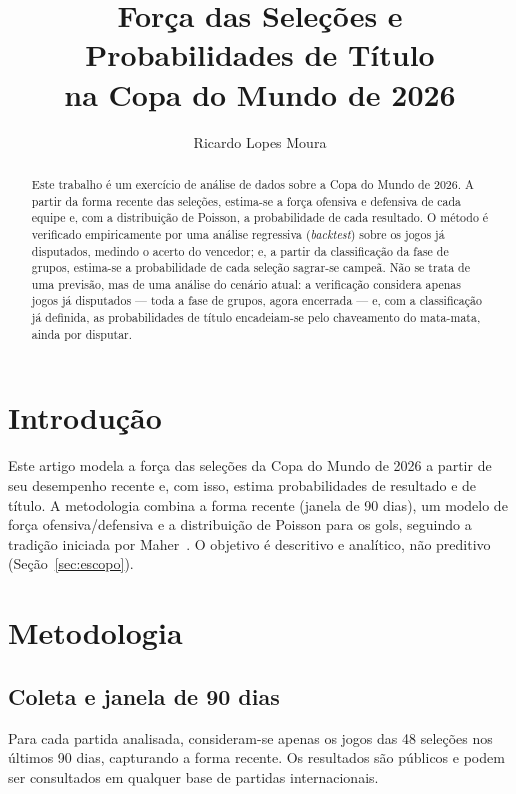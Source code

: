 \documentclass[11pt,a4paper]{article}
\title{Força das Seleções e Probabilidades de Título\\na Copa do Mundo de 2026}
\author{Ricardo Lopes Moura}
\date{\dataAnalise}
\begin{document}
\maketitle

\begin{abstract}
Este trabalho é um exercício de análise de dados sobre a Copa do Mundo de 2026.
A partir da forma recente das seleções, estima-se a força ofensiva e defensiva de
cada equipe e, com a distribuição de Poisson, a probabilidade de cada resultado.
O método é verificado empiricamente por uma análise regressiva (\emph{backtest})
sobre os jogos já disputados, medindo o acerto do vencedor; e, a partir da
classificação da fase de grupos, estima-se a probabilidade de cada seleção
sagrar-se campeã. Não se trata de uma previsão, mas de uma análise do cenário
atual: a verificação considera apenas jogos já disputados --- toda a fase de
grupos, agora encerrada --- e, com a classificação já definida, as probabilidades
de título encadeiam-se pelo chaveamento do mata-mata, ainda por disputar.
\end{abstract}

\section{Introdução}
Este artigo modela a força das seleções da Copa do Mundo de 2026 a partir de seu
desempenho recente e, com isso, estima probabilidades de resultado e de título.
A metodologia combina a forma recente (janela de 90 dias), um modelo de força
ofensiva/defensiva e a distribuição de Poisson para os gols, seguindo a tradição
iniciada por Maher~\cite{maher1982}. O objetivo é descritivo e analítico, não
preditivo (Seção~\ref{sec:escopo}).

\section{Metodologia}
\subsection{Coleta e janela de 90 dias}
Para cada partida analisada, consideram-se apenas os jogos das 48 seleções nos
últimos 90 dias, capturando a forma recente. Os resultados são públicos e podem
ser consultados em qualquer base de partidas internacionais.
\end{document}
